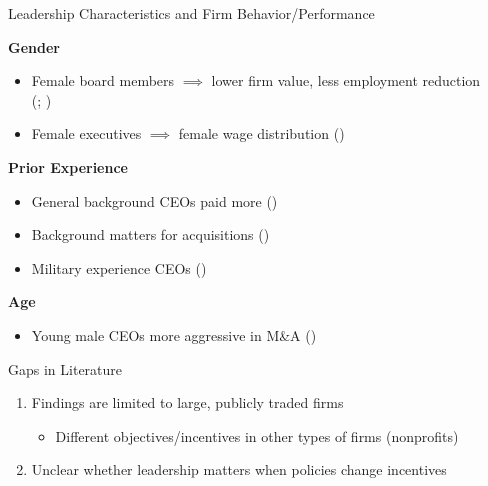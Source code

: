 \documentclass[notes,11pt, aspectratio=169]{beamer}
\begin{document}
\begin{frame}{Leadership Characteristics and Firm Behavior/Performance}

\large

\textbf{Gender}
\begin{itemize}
    \item \normalsize Female board members $\implies$ lower firm value, less employment reduction \\ \scriptsize(\cite{ahern2012changing}; \cite{matsa2013female}) \normalsize
    \item Female executives $\implies$ female wage distribution \scriptsize (\cite{flabbi2019female}) \normalsize
\end{itemize}

\vspace{4mm}

\textbf{Prior Experience}
\begin{itemize}
    \item \normalsize General background CEOs paid more \scriptsize (\cite{custodio2013generalists}) \normalsize
    \item Background matters for acquisitions \scriptsize(\cite{custodio2013ceos}) \normalsize

\vspace{1mm}
    
    \item Military experience CEOs \scriptsize (\cite{benmelech2015military})
\end{itemize}

\vspace{4mm}

\textbf{Age}
\begin{itemize}
    \item \normalsize Young male CEOs more aggressive in M\&A \scriptsize (\cite{levi2010deal})
\end{itemize}


\end{frame}

\begin{frame}{Gaps in Literature}
    \large
    \begin{enumerate}
        \item Findings are limited to large, publicly traded firms

\vspace{2mm}
        
        \begin{itemize}
            \item \normalsize Different objectives/incentives in other types of firms (nonprofits)
        \end{itemize}

        \vspace{10mm}
        
        \item Unclear whether leadership matters when policies change incentives
    \end{enumerate}
\end{frame}
\end{document}
